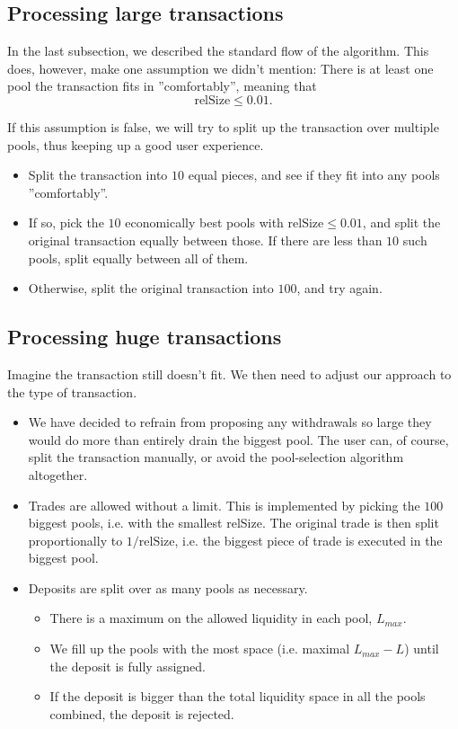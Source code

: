 \documentclass[12pt]{article}
\begin{document}
\subsection{Processing large transactions}

In the last subsection, we described the standard flow of the algorithm.
This does, however, make one assumption we didn't mention:
There is at least one pool the transaction fits in ''comfortably'', meaning that
$$ \text{relSize} \leq 0.01. $$

If this assumption is false, we will try to split up the transaction over
multiple pools, thus keeping up a good user experience.
\begin{itemize}
  \item Split the transaction into $10$ equal pieces, and see if they fit into
    any pools ''comfortably''.
  \item If so, pick the $10$ economically best pools with $\text{relSize} \leq
    0.01$, and split the original transaction equally between those. If there
    are less than $10$ such pools, split equally between all of them.
  \item Otherwise, split the original transaction into $100$, and try again.
\end{itemize}

\subsection{Processing huge transactions}

Imagine the transaction still doesn't fit.
We then need to adjust our approach to the type of transaction.

\begin{itemize}
  \item We have decided to refrain from proposing any withdrawals so large they
    would do more than entirely drain the biggest pool.
    The user can, of course, split the transaction manually, or avoid the pool-selection algorithm altogether.
  \item Trades are allowed without a limit.
    This is implemented by picking the $100$ biggest pools, i.e. with the
    smallest relSize.
    The original trade is then split proportionally to $1 / \text{relSize}$,
    i.e. the biggest piece of trade is executed in the biggest pool.
  \item Deposits are split over as many pools as necessary.
    \begin{itemize}
      \item There is a maximum on the allowed liquidity in each pool, $L_{max}$.
      \item We fill up the pools with the most space (i.e. maximal $L_{max} -
        L$) until the deposit is fully assigned.
      \item If the deposit is bigger than the total liquidity space in all
        the pools combined, the deposit is rejected.
    \end{itemize}
\end{itemize}
\end{document}
